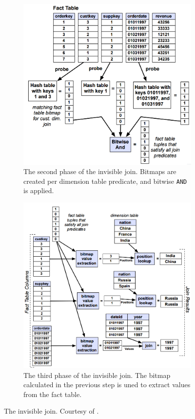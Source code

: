 \begin{figure}
\begin{subfigure}{0.45\textwidth}
    \includegraphics[width=\textwidth]{img/invisible-join-2.png}
    \caption{The second phase of the invisible join. Bitmaps are created per dimension table predicate, and bitwise \texttt{AND} is applied.}
    \label{fig:invisible-join-1} 
  \end{subfigure}
  \begin{subfigure}{0.45\textwidth}
    \includegraphics[width=\textwidth]{img/invisible-join-3.png}
    \caption{The third phase of the invisible join. The bitmap calculated in the previous step is uned to extract values from the fact table.}
    \label{fig:invisible-join-1} 
  \end{subfigure}
  \caption{The invisible join. Courtesy of \cite{Abadi2008-dd}.}
  \label{fig:invisible-join} 
\end{figure}
